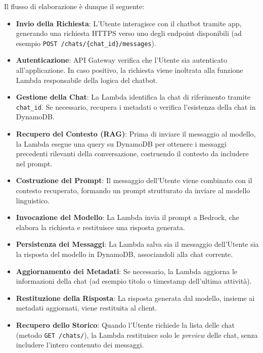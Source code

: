 \documentclass[a4paper,12pt]{article}
\newcommand{\ignoreglossary}{}
\begin{document}
Il flusso di elaborazione è dunque il seguente:
\begin{itemize}
    \item \textbf{Invio della Richiesta}: L’Utente interagisce con il chatbot tramite app, generando una richiesta HTTPS verso uno degli endpoint disponibili (ad esempio \texttt{POST /chats/\{chat\_id\}/messages}).
    
    \item \textbf{Autenticazione}: API Gateway \ignoreglossary{verifica} che l’Utente sia autenticato all’applicazione. In caso positivo, la richiesta viene inoltrata alla funzione Lambda responsabile della logica del chatbot.
    
    \item \textbf{Gestione della Chat}: La Lambda identifica la chat di riferimento tramite \texttt{chat\_id}. Se necessario, recupera i metadati o \ignoreglossary{verifica} l’esistenza della chat in DynamoDB.
    
    \item \textbf{Recupero del Contesto (RAG)}: Prima di inviare il messaggio al modello, la Lambda esegue una query su DynamoDB per ottenere i messaggi precedenti rilevanti della conversazione, costruendo il contesto da includere nel prompt.
    
    \item \textbf{Costruzione del Prompt}: Il messaggio dell’Utente viene combinato con il contesto recuperato, formando un prompt strutturato da inviare al modello linguistico.
    
    \item \textbf{Invocazione del Modello}: La Lambda invia il prompt a Bedrock, che elabora la richiesta e restituisce una risposta generata.
    
    \item \textbf{Persistenza dei Messaggi}: La Lambda salva sia il messaggio dell’Utente sia la risposta del modello in DynamoDB, associandoli alla chat corrente.
    
    \item \textbf{Aggiornamento dei Metadati}: Se necessario, la Lambda aggiorna le informazioni della chat (ad esempio titolo o timestamp dell’ultima attività).
    
    \item \textbf{Restituzione della Risposta}: La risposta generata dal modello, insieme ai metadati aggiornati, viene restituita al client.
    
    \item \textbf{Recupero dello Storico}: Quando l’Utente richiede la lista delle chat (metodo \texttt{GET /chats/}), la Lambda restituisce solo le \textit{preview} delle chat, senza includere l’intero contenuto dei messaggi.
    

\end{itemize}
\end{document}
